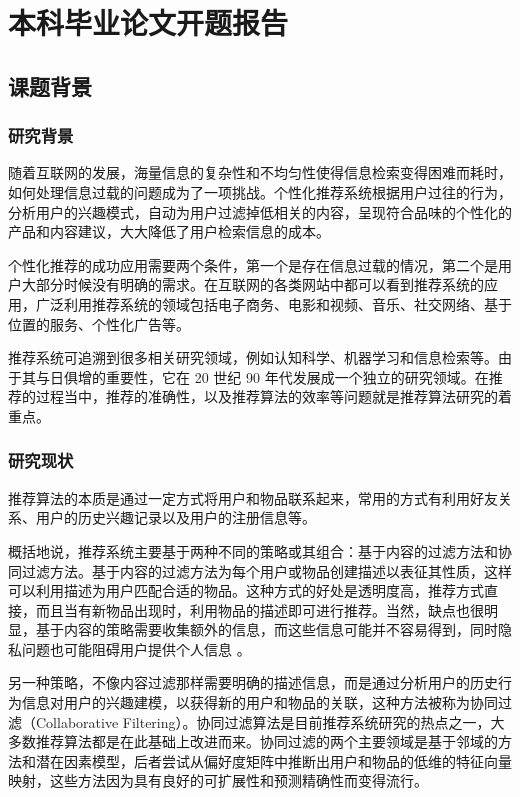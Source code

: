 
\chapter{本科毕业论文开题报告}

\section{课题背景}
\subsection{研究背景} %
\label{sub:研究背景}
随着互联网的发展，海量信息的复杂性和不均匀性使得信息检索变得困难而耗时，如何处理信息过载的问题成为了一项挑战。个性化推荐系统根据用户过往的行为，分析用户的兴趣模式，自动为用户过滤掉低相关的内容，呈现符合品味的个性化的产品和内容建议，大大降低了用户检索信息的成本。

个性化推荐的成功应用需要两个条件，第一个是存在信息过载的情况，第二个是用户大部分时候没有明确的需求。在互联网的各类网站中都可以看到推荐系统的应用，广泛利用推荐系统的领域包括电子商务、电影和视频、音乐、社交网络、基于位置的服务、个性化广告等。

推荐系统可追溯到很多相关研究领域，例如认知科学、机器学习和信息检索等\cite{肖力涛2016基于隐式因子和隐式主题的跨域推荐算法研究}。由于其与日俱增的重要性，它在 20 世纪 90 年代发展成一个独立的研究领域。在推荐的过程当中，推荐的准确性，以及推荐算法的效率等问题就是推荐算法研究的着重点。


\subsection{研究现状} %
\label{sub:研究现状}
推荐算法的本质是通过一定方式将用户和物品联系起来，常用的方式有利用好友关系、用户的历史兴趣记录以及用户的注册信息等\cite{项亮2012推荐系统实践}。

概括地说，推荐系统主要基于两种不同的策略或其组合：基于内容的过滤方法和协同过滤方法。基于内容的过滤方法为每个用户或物品创建描述以表征其性质，这样可以利用描述为用户匹配合适的物品。这种方式的好处是透明度高，推荐方式直接，而且当有新物品出现时，利用物品的描述即可进行推荐。当然，缺点也很明显，基于内容的策略需要收集额外的信息，而这些信息可能并不容易得到，同时隐私问题也可能阻碍用户提供个人信息 \cite{Koren2009Matrix}。

另一种策略，不像内容过滤那样需要明确的描述信息，而是通过分析用户的历史行为信息对用户的兴趣建模，以获得新的用户和物品的关联，这种方法被称为协同过滤（Collaborative Filtering）\cite{Goldberg1992Using}。协同过滤算法是目前推荐系统研究的热点之一，大多数推荐算法都是在此基础上改进而来。协同过滤的两个主要领域是基于邻域的方法和潜在因素模型，后者尝试从偏好度矩阵中推断出用户和物品的低维的特征向量映射，这些方法因为具有良好的可扩展性和预测精确性而变得流行。


